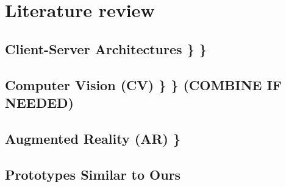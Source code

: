 \chapter{Literature review} \label{Literature review}

\section{Client-Server Architectures    \}    \}} \label{csa}

\section{Computer Vision (CV)           \}    \}    (COMBINE IF NEEDED)} \label{cv}

\section{Augmented Reality (AR)               \}} \label{ar}

\section{Prototypes Similar to Ours} \label{protos}
